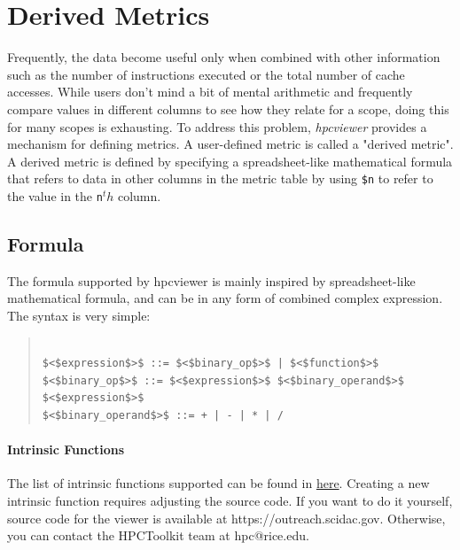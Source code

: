\documentclass[a4paper,11pt]{article}
\begin{document}
\section{Derived Metrics}

 Frequently, the data become useful only when combined with other information such as the number of instructions executed or  the total number of cache accesses.  While users don't mind a bit of mental arithmetic and frequently compare values in different  columns to see how they relate for a scope, doing this for many scopes is exhausting.  To address this problem, \textit{hpcviewer} provides a mechanism for defining metrics.  A user-defined metric is called a "derived metric". A derived metric is defined by specifying a spreadsheet-like mathematical formula that  refers to data in other columns in the metric table by using 
\texttt{\$n} to refer to the value in the 
\texttt{n}$^th$ column. 

\subsection{Formula}

 The formula supported by hpcviewer is mainly inspired by spreadsheet-like mathematical formula, and can be in any form of combined complex expression. The syntax is very simple: 
\begin{quotation}
\begin{verbatim}

$<$expression$>$ ::= $<$binary_op$>$ | $<$function$>$ 
$<$binary_op$>$ ::= $<$expression$>$ $<$binary_operand$>$ $<$expression$>$
$<$binary_operand$>$ ::= + | - | * | /
 \end{verbatim}
\end{quotation}

\paragraph{Intrinsic Functions} The list of intrinsic functions supported can be found in \href{functions.html}{here}. Creating a new intrinsic function requires adjusting the source code. If you want to do it yourself, source code for the viewer is available at https://outreach.scidac.gov. Otherwise, you can contact the HPCToolkit team at hpc@rice.edu.  
\end{document}
